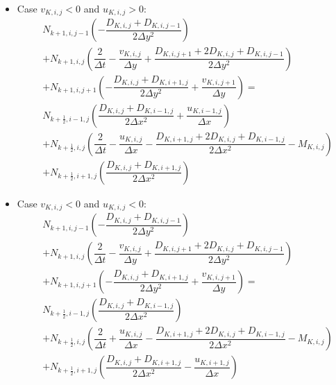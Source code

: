 \begin{itemize}
\begin{align}
  -\dfrac{u_{K,i+1,j}}{\Delta x}\right)
 \end{align}
\item Case $v_{K,i,j}<0$ and $u_{K,i,j}>0$:
\begin{align}
  \label{eq:2steps-ADI-y-vneg-upos}
  \nonumber
  &N_{k+1,i,j-1}  \left(
    -\dfrac{D_{K,i,j}+D_{K,i,j-1}}{2\Delta y^2}
  \right) 
  \\\nonumber
  &+ N_{k+1,i,j}  \left(
    \dfrac{2}{\Delta t} 
    -\dfrac{v_{K,i,j}}{\Delta y}
    +\dfrac{D_{K,i,j+1}+2D_{K,i,j}+D_{K,i,j-1}}{2\Delta y^2}\right) 
  \\\nonumber
  & + N_{k+1,i,j+1} \left(
    -\dfrac{D_{K,i,j}+D_{K,i+1,j}}{2\Delta y^2}
    +\dfrac{v_{K,i,j+1}}{\Delta y}
  \right) = 
  \\
  \nonumber
  &N_{k+\frac{1}{2},i-1,j}\left(\dfrac{D_{K,i,j}+D_{K,i-1,j}}{2\Delta x^2}
    +\dfrac{u_{K,i-1,j}}{\Delta x}\right)
  \\\nonumber
  &+ N_{k+\frac{1}{2},i,j}\left(\dfrac{2}{\Delta t}-\dfrac{u_{K,i,j}}{\Delta x}
    -\dfrac{D_{K,i+1,j}+2D_{K,i,j}+D_{K,i-1,j}}{2\Delta x^2}- M_{K,i,j} \right)\\
  &+N_{k+\frac{1}{2},i+1,j}\left(\dfrac{D_{K,i,j}+D_{K,i+1,j}}{2\Delta x^2}\right)
\end{align}
\item Case $v_{K,i,j}<0$ and $u_{K,i,j}<0$:
\begin{align}
  \label{eq:2steps-ADI-y-vneg-uneg}
  \nonumber
  &N_{k+1,i,j-1}  \left(
    -\dfrac{D_{K,i,j}+D_{K,i,j-1}}{2\Delta y^2}
  \right) 
  \\\nonumber
  &+ N_{k+1,i,j}  \left(
    \dfrac{2}{\Delta t} 
    -\dfrac{v_{K,i,j}}{\Delta y}
    +\dfrac{D_{K,i,j+1}+2D_{K,i,j}+D_{K,i,j-1}}{2\Delta y^2}\right) 
  \\\nonumber
  & + N_{k+1,i,j+1} \left(
    -\dfrac{D_{K,i,j}+D_{K,i+1,j}}{2\Delta y^2}
    +\dfrac{v_{K,i,j+1}}{\Delta y}
  \right) = 
  \\
  \nonumber
  &N_{k+\frac{1}{2},i-1,j}\left(\dfrac{D_{K,i,j}+D_{K,i-1,j}}{2\Delta x^2}\right)
  \\\nonumber
  &+ N_{k+\frac{1}{2},i,j}\left(\dfrac{2}{\Delta t}+\dfrac{u_{K,i,j}}{\Delta x}
    -\dfrac{D_{K,i+1,j}+2D_{K,i,j}+D_{K,i-1,j}}{2\Delta x^2}- M_{K,i,j} \right)\\
  &+N_{k+\frac{1}{2},i+1,j}\left(\dfrac{D_{K,i,j}+D_{K,i+1,j}}{2\Delta x^2}
  -\dfrac{u_{K,i+1,j}}{\Delta x}\right)
\end{align}
\end{itemize}

